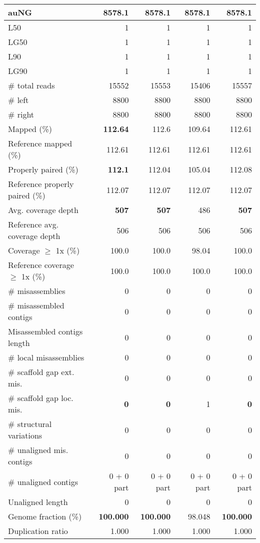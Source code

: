 \documentclass[12pt,a4paper]{article}
\begin{document}
\begin{table}[ht]
\begin{center}
\begin{tabular}{|l*{4}{|r}|}
auNG & 8578.1 & 8578.1 & 8578.1 & 8578.1 \\ \hline
L50 & 1 & 1 & 1 & 1 \\ \hline
LG50 & 1 & 1 & 1 & 1 \\ \hline
L90 & 1 & 1 & 1 & 1 \\ \hline
LG90 & 1 & 1 & 1 & 1 \\ \hline
\# total reads & 15552 & 15553 & 15406 & 15557 \\ \hline
\# left & 8800 & 8800 & 8800 & 8800 \\ \hline
\# right & 8800 & 8800 & 8800 & 8800 \\ \hline
Mapped (\%) & {\bf 112.64} & 112.6 & 109.64 & 112.61 \\ \hline
Reference mapped (\%) & 112.61 & 112.61 & 112.61 & 112.61 \\ \hline
Properly paired (\%) & {\bf 112.1} & 112.04 & 105.04 & 112.08 \\ \hline
Reference properly paired (\%) & 112.07 & 112.07 & 112.07 & 112.07 \\ \hline
Avg. coverage depth & {\bf 507} & {\bf 507} & 486 & {\bf 507} \\ \hline
Reference avg. coverage depth & 506 & 506 & 506 & 506 \\ \hline
Coverage $\geq$ 1x (\%) & 100.0 & 100.0 & 98.04 & 100.0 \\ \hline
Reference coverage $\geq$ 1x (\%) & 100.0 & 100.0 & 100.0 & 100.0 \\ \hline
\# misassemblies & 0 & 0 & 0 & 0 \\ \hline
\# misassembled contigs & 0 & 0 & 0 & 0 \\ \hline
Misassembled contigs length & 0 & 0 & 0 & 0 \\ \hline
\# local misassemblies & 0 & 0 & 0 & 0 \\ \hline
\# scaffold gap ext. mis. & 0 & 0 & 0 & 0 \\ \hline
\# scaffold gap loc. mis. & {\bf 0} & {\bf 0} & 1 & {\bf 0} \\ \hline
\# structural variations & 0 & 0 & 0 & 0 \\ \hline
\# unaligned mis. contigs & 0 & 0 & 0 & 0 \\ \hline
\# unaligned contigs & 0 + 0 part & 0 + 0 part & 0 + 0 part & 0 + 0 part \\ \hline
Unaligned length & 0 & 0 & 0 & 0 \\ \hline
Genome fraction (\%) & {\bf 100.000} & {\bf 100.000} & 98.048 & {\bf 100.000} \\ \hline
Duplication ratio & 1.000 & 1.000 & 1.000 & 1.000 \\ \hline

\end{tabular}
\end{center}
\end{table}
\end{document}
